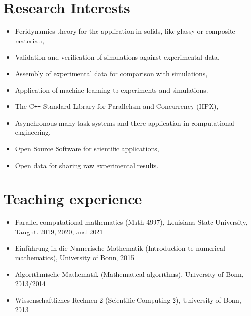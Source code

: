 \documentclass[11pt,a4paper,sans]{moderncv}
\begin{document}
\section{Research Interests}

\begin{itemize}[leftmargin=4cm]
\item Peridynamics theory for the application in solids, like glassy or composite materials,
\item Validation and verification of simulations against experimental data,
\item Assembly of experimental data for comparison with simulations,
\item Application of machine learning to experiments and simulations.
\end{itemize}
\begin{itemize}[leftmargin=4cm]
\item The C\texttt{++} Standard Library for Parallelism and Concurrency (HPX),
\item Asynchronous many task systems and there application in computational engineering.
\end{itemize}
\begin{itemize}[leftmargin=4cm]
\item Open Source Software for scientific applications,
\item Open data for sharing raw experimental results.
\end{itemize}
\section{Teaching experience}
\begin{itemize}[leftmargin=4cm]
\item Parallel computational mathematics (Math 4997), Louisiana State University, Taught: 2019, 2020, and 2021
\end{itemize}

\begin{itemize}[leftmargin=4cm]
\item Einf\"uhrung in die Numerische Mathematik (Introduction to numerical mathematics), University of Bonn, 2015
\item Algorithmische Mathematik (Mathematical algorithms), University of Bonn, 2013/2014
\item Wissenschaftliches Rechnen 2 (Scientific Computing 2),  University of Bonn, 2013 
\end{itemize}
\end{document}
